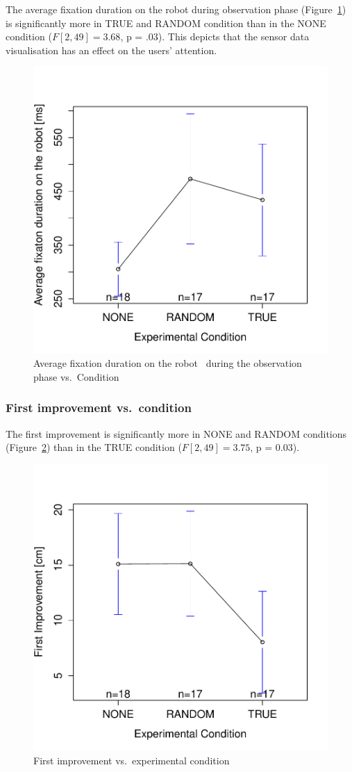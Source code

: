 \documentclass{sig-alternate}
\begin{document}
The average fixation duration on the robot during observation phase
(Figure~\ref{res1}) is significantly more in {\sf TRUE} and {\sf RANDOM} condition than in
the {\sf NONE} condition ($F[2,49]=3.68$, p = .03). This depicts that the
sensor data visualisation has an effect on the users' attention.

\begin{figure}[h!]
    \centering
    \includegraphics[width=0.8\linewidth]{meanPlotFixRobo}
    \caption{Average fixation duration on the robot ~during the observation phase
    vs.~Condition}
    \label{res1}
\end{figure}

\subsubsection{First improvement vs.~condition}

The first improvement is significantly more in {\sf NONE} and {\sf RANDOM}
conditions (Figure~\ref{res2}) than in the {\sf TRUE} condition ($F[2,49]=3.75$, p =
0.03).

\begin{figure}[h!]
    \centering
    \includegraphics[width=0.8\linewidth]{meanPlotFirstImprove}
    \caption{First improvement vs.~experimental condition}
    \label{res2}
\end{figure}
\end{document}
